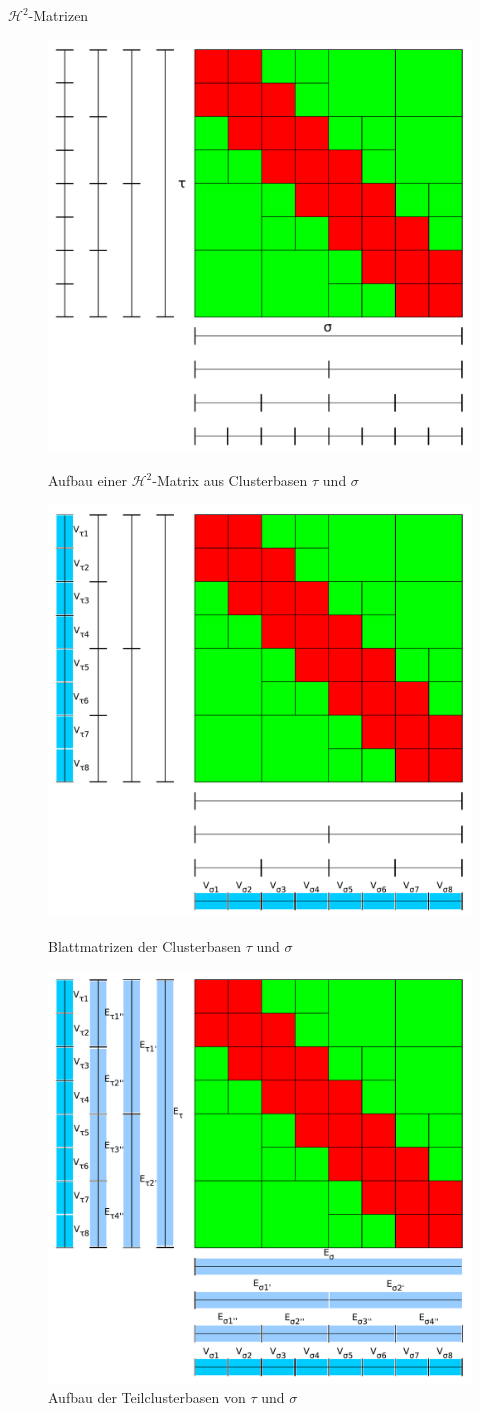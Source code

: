 \documentclass[10pt]{beamer}
\begin{document}
\begin{frame}{\(\mathcal{H}^2\)-Matrizen}
  \begin{figure}
    \begin{overprint}
      \centering\includegraphics[width=.5\linewidth]{figures/fg-h2-matrix.pdf}\caption{Aufbau einer \(\mathcal{H}^2\)-Matrix aus Clusterbasen \( \tau \) und \( \sigma \)}
      \centering\includegraphics[width=.5\linewidth]{figures/fg-h2-leaf-matrices.pdf}\caption{Blattmatrizen der Clusterbasen \(\tau\) und \(\sigma\)}
      \centering\includegraphics[width=.5\linewidth]{figures/fg-h2-transfer-matrices.pdf}\caption{Aufbau der Teilclusterbasen von \(\tau\) und \(\sigma\)}

\end{overprint}
\end{figure}
\end{frame}
\end{document}
